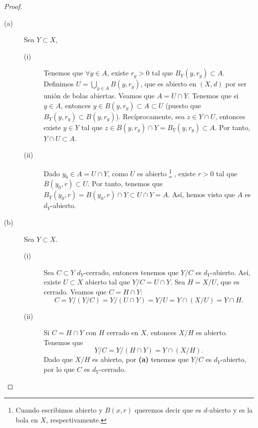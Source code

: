 \begin{proof}
\begin{description}
\item[(a)] Sea $\displaystyle Y \subset X $,
	\begin{description}
	\item[(i)] Tenemos que $\displaystyle \forall y \in A $, existe $\displaystyle r_{y}>0 $ tal que $\displaystyle B_{Y}\left(y,r_{y}\right) \subset A $. Definimos $\displaystyle U = \bigcup_{y \in A}B\left(y,r_{y}\right) $, que es abierto en $\displaystyle \left(X,d\right) $ por ser unión de bolas abiertas.
Veamos que $\displaystyle A = U \cap Y $. Tenemos que si $\displaystyle y \in A $, entonces $\displaystyle y \in B\left(y, r_{y}\right) \subset A \subset U $ (puesto que $\displaystyle B_{Y}\left(y, r_{y}\right) \subset B\left(y, r_{y}\right) $).
Recíprocamente, sea $\displaystyle z \in Y \cap U $, entonces existe $\displaystyle y \in Y $ tal que $\displaystyle z \in B\left(y,r_{y}\right) \cap Y = B_{Y}\left(y,r_{y}\right) \subset A$. Por tanto, $\displaystyle Y \cap U \subset A $.
	\item[(ii)] Dado $\displaystyle y_{0} \in A = U \cap Y $, como $\displaystyle U $ es abierto \footnote{Cuando escribimos abierto y $\displaystyle B\left(x,r\right) $ queremos decir que es $\displaystyle d $-abierto y es la bola en $\displaystyle X $, respectivamente.} , existe $\displaystyle r > 0 $ tal que $\displaystyle B\left(y_{0}, r\right)\subset U $. Por tanto, tenemos que $\displaystyle B_{Y}\left(y_{0}, r\right) = B\left(y_{0}, r\right)\cap Y \subset U \cap Y = A $. Así, hemos visto que $\displaystyle A $ es $\displaystyle d _{Y} $-abierto.
	\end{description}
\item[(b)] Sea $\displaystyle Y \subset X $.
	\begin{description}
	\item[(i)] Sea $\displaystyle C \subset Y $ $\displaystyle d _{Y} $-cerrado, entonces tenemos que $\displaystyle Y/C $ es $\displaystyle d _{Y} $-abierto. Así, existe $\displaystyle U \subset X $ abierto tal que $\displaystyle Y/C = U \cap Y $. Sea $\displaystyle H = X/U $, que es cerrado. Veamos que $\displaystyle C = H \cap Y $:
\[C = Y / \left(Y / C\right) = Y / \left(U \cap Y\right) = Y / U = Y \cap \left(X/U\right) = Y \cap H .\]
\item[(ii)] Si $\displaystyle C = H\cap Y $ con $\displaystyle H $ cerrado en $\displaystyle X $, entonces $\displaystyle X/H $ es abierto. Tenemos que
	\[Y/C = Y / \left(H \cap Y\right) = Y \cap \left(X/H\right) .\]
	Dado que $\displaystyle X/H $ es abierto, por \textbf{(a)} tenemos que $\displaystyle Y/C $ es $\displaystyle d _{Y} $-abierto, por lo que $\displaystyle C $ es $\displaystyle d _{Y} $-cerrado.
	\end{description}
\end{description}
\end{proof}
